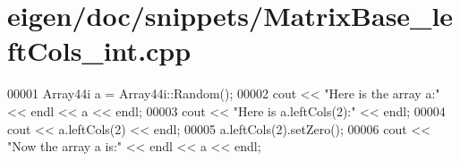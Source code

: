 \hypertarget{eigen_2doc_2snippets_2_matrix_base__left_cols__int_8cpp_source}{}\section{eigen/doc/snippets/\+Matrix\+Base\+\_\+left\+Cols\+\_\+int.cpp}
\label{eigen_2doc_2snippets_2_matrix_base__left_cols__int_8cpp_source}

\begin{DoxyCode}
00001 Array44i a = Array44i::Random();
00002 cout << \textcolor{stringliteral}{"Here is the array a:"} << endl << a << endl;
00003 cout << \textcolor{stringliteral}{"Here is a.leftCols(2):"} << endl;
00004 cout << a.leftCols(2) << endl;
00005 a.leftCols(2).setZero();
00006 cout << \textcolor{stringliteral}{"Now the array a is:"} << endl << a << endl;
\end{DoxyCode}
